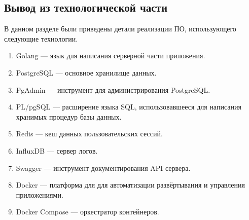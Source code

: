 \clearpage



\subsection*{Вывод из технологической части}

В данном разделе были приведены детали реализации ПО, использующего следующие технологии.

\begin{enumerate}[label*=\arabic*.]
	\item Golang --- язык для написания серверной части приложения.
	\item PostgreSQL --- основное хранилище данных.
	\item PgAdmin --- инструмент для администрирования PostgreSQL.
	\item PL/pgSQL --- расширение языка SQL, использовавшееся для написания хранимых процедур базы данных.
	\item Redis --- кеш данных пользовательских сессий.
	\item InfluxDB --- сервер логов.
	\item Swagger --- инструмент документирования API сервера.
	\item Docker --- платформа для для автоматизации развёртывания и управления приложениями.
	\item Docker Compose --- оркестратор контейнеров.
\end{enumerate}

\pagebreak